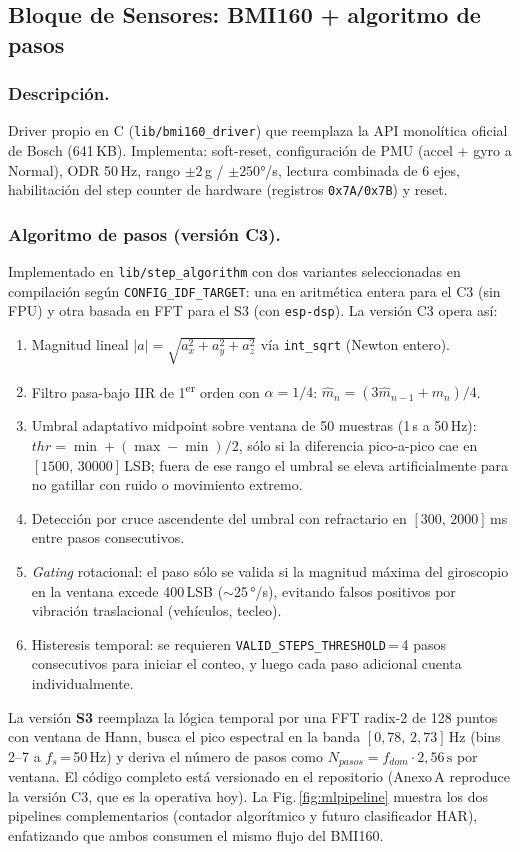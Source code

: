 \documentclass[letterpaper,11pt]{article}
\newcommand{\rfigura}[1]{Fig.\,\ref{#1}}
\begin{document}
\subsection{Bloque de Sensores: BMI160 + algoritmo de pasos}
\subsubsection{Descripción.} Driver propio en C (\texttt{lib/bmi160\_driver}) que reemplaza la
API monolítica oficial de Bosch (641\,KB). Implementa: soft-reset, configuración de PMU
(accel + gyro a Normal), ODR 50\,Hz, rango $\pm 2$\,g / $\pm 250$°/s, lectura combinada de
6 ejes, habilitación del step counter de hardware (registros \texttt{0x7A/0x7B}) y reset.

\subsubsection{Algoritmo de pasos (versión C3).} Implementado en \texttt{lib/step\_algorithm}
con dos variantes seleccionadas en compilación según \texttt{CONFIG\_IDF\_TARGET}: una en
aritmética entera para el C3 (sin FPU) y otra basada en FFT para el S3 (con \texttt{esp-dsp}).
La versión C3 opera así:
\begin{enumerate}
    \item Magnitud lineal $|a| = \sqrt{a_x^2 + a_y^2 + a_z^2}$ vía \texttt{int\_sqrt} (Newton entero).
    \item Filtro pasa-bajo IIR de 1\textsuperscript{er} orden con $\alpha=1/4$:
    $\hat{m}_n = (3\hat{m}_{n-1} + m_n)/4$.
    \item Umbral adaptativo midpoint sobre ventana de 50 muestras (1\,s a 50\,Hz):
    $thr = \min + (\max-\min)/2$, sólo si la diferencia pico-a-pico cae en
    $[1500,\,30000]$\,LSB; fuera de ese rango el umbral se eleva artificialmente para
    no gatillar con ruido o movimiento extremo.
    \item Detección por cruce ascendente del umbral con refractario en
    $[300,\,2000]$\,ms entre pasos consecutivos.
    \item \textit{Gating} rotacional: el paso sólo se valida si la magnitud máxima
    del giroscopio en la ventana excede 400\,LSB ($\sim$25\,°/s), evitando falsos
    positivos por vibración traslacional (vehículos, tecleo).
    \item Histeresis temporal: se requieren \texttt{VALID\_STEPS\_THRESHOLD}\,=\,4
    pasos consecutivos para iniciar el conteo, y luego cada paso adicional cuenta
    individualmente.
\end{enumerate}
La versión \textbf{S3} reemplaza la lógica temporal por una FFT radix-2 de 128 puntos
con ventana de Hann, busca el pico espectral en la banda \mbox{$[0{,}78,\,2{,}73]$\,Hz}
(bins 2--7 a $f_s$\,=\,50\,Hz) y deriva el número de pasos como
$N_{pasos}=f_{dom}\cdot 2{,}56\,\text{s}$ por ventana. El código completo está versionado
en el repositorio (Anexo\,A reproduce la versión C3, que es la operativa hoy).
La \rfigura{fig:mlpipeline} muestra los dos pipelines complementarios (contador algorítmico
y futuro clasificador HAR), enfatizando que ambos consumen el mismo flujo del BMI160.
\end{document}
